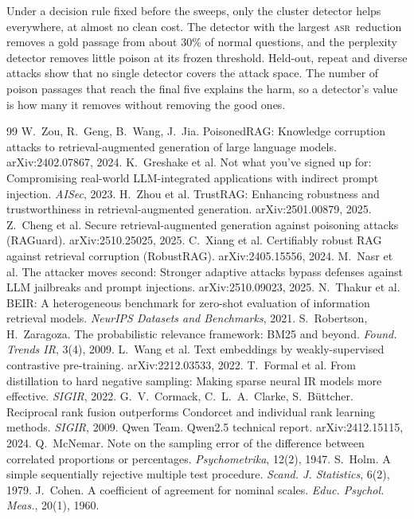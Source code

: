 \documentclass[10pt,a4paper,twocolumn]{article}
\makeatletter
\renewcommand\section{\@startsection{section}{1}{\z@}{-1.6ex plus -.4ex}{0.6ex}{\normalfont\large\bfseries}}
\newcommand{\asr}{\textsc{asr}}
\makeatother
\begin{document}
\section{Conclusion}
Under a decision rule fixed before the sweeps, only the cluster detector helps everywhere, at almost no clean cost. The detector with the largest \asr\ reduction removes a gold passage from about 30\% of normal questions, and the perplexity detector removes little poison at its frozen threshold. Held-out, repeat and diverse attacks show that no single detector covers the attack space. The number of poison passages that reach the final five explains the harm, so a detector's value is how many it removes without removing the good ones.

{\footnotesize
\begin{thebibliography}{99}
\setlength{\itemsep}{0pt}\setlength{\parskip}{0pt}
 W.~Zou, R.~Geng, B.~Wang, J.~Jia. PoisonedRAG: Knowledge corruption attacks to retrieval-augmented generation of large language models. arXiv:2402.07867, 2024.
 K.~Greshake et al. Not what you've signed up for: Compromising real-world LLM-integrated applications with indirect prompt injection. \emph{AISec}, 2023.
 H.~Zhou et al. TrustRAG: Enhancing robustness and trustworthiness in retrieval-augmented generation. arXiv:2501.00879, 2025.
 Z.~Cheng et al. Secure retrieval-augmented generation against poisoning attacks (RAGuard). arXiv:2510.25025, 2025.
 C.~Xiang et al. Certifiably robust RAG against retrieval corruption (RobustRAG). arXiv:2405.15556, 2024.
 M.~Nasr et al. The attacker moves second: Stronger adaptive attacks bypass defenses against LLM jailbreaks and prompt injections. arXiv:2510.09023, 2025.
 N.~Thakur et al. BEIR: A heterogeneous benchmark for zero-shot evaluation of information retrieval models. \emph{NeurIPS Datasets and Benchmarks}, 2021.
 S.~Robertson, H.~Zaragoza. The probabilistic relevance framework: BM25 and beyond. \emph{Found. Trends IR}, 3(4), 2009.
 L.~Wang et al. Text embeddings by weakly-supervised contrastive pre-training. arXiv:2212.03533, 2022.
 T.~Formal et al. From distillation to hard negative sampling: Making sparse neural IR models more effective. \emph{SIGIR}, 2022.
 G.~V.~Cormack, C.~L.~A.~Clarke, S.~B\"uttcher. Reciprocal rank fusion outperforms Condorcet and individual rank learning methods. \emph{SIGIR}, 2009.
 Qwen Team. Qwen2.5 technical report. arXiv:2412.15115, 2024.
 Q.~McNemar. Note on the sampling error of the difference between correlated proportions or percentages. \emph{Psychometrika}, 12(2), 1947.
 S.~Holm. A simple sequentially rejective multiple test procedure. \emph{Scand. J. Statistics}, 6(2), 1979.
 J.~Cohen. A coefficient of agreement for nominal scales. \emph{Educ. Psychol. Meas.}, 20(1), 1960.
\end{thebibliography}
}
\end{document}
